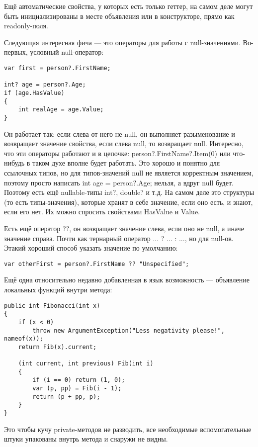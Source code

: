 \documentclass{../../text-style}
\begin{document}
Ещё автоматические свойства, у которых есть только геттер, на самом деле могут быть инициализированы в месте объявления или в конструкторе, прямо как readonly-поля.

Следующая интересная фича --- это операторы для работы с null-значениями. Во-первых, условный null-оператор:

\begin{verbatim}
var first = person?.FirstName;

int? age = person?.Age;
if (age.HasValue)
{
    int realAge = age.Value;
}
\end{verbatim}

Он работает так: если слева от него не null, он выполняет разыменование и возвращает значение свойства, если слева null, то возвращает null. Интересно, что эти операторы работают и в цепочке: person?.FirstName?.Item(0) или что-нибудь в таком духе вполне будет работать. Это хорошо и понятно для ссылочных типов, но для типов-значений null не является корректным значением, поэтому просто написать int age = person?.Age; нельзя, а вдруг null будет. Поэтому есть ещё nullable-типы int?, double? и т.д. На самом деле это структуры (то есть типы-значения), которые хранят в себе значение, если оно есть, и знают, если его нет. Их можно спросить свойствами HasValue и Value.

Есть ещё оператор ??, он возвращает значение слева, если оно не null, а иначе значение справа. Почти как тернарный оператор ... ? ... : ..., но для null-ов. Этакий хороший способ указать значение по умолчанию:

\begin{verbatim}
var otherFirst = person?.FirstName ?? "Unspecified";
\end{verbatim}

Ещё одна относительно недавно добавленная в язык возможность --- объявление локальных функций внутри метода:

\begin{verbatim}
public int Fibonacci(int x)
{
    if (x < 0) 
        throw new ArgumentException("Less negativity please!", nameof(x));
    return Fib(x).current;

    (int current, int previous) Fib(int i)
    {
        if (i == 0) return (1, 0);
        var (p, pp) = Fib(i - 1);
        return (p + pp, p);
    }
}
\end{verbatim}

Это чтобы кучу private-методов не разводить, все необходимые вспомогательные штуки упакованы внутрь метода и снаружи не видны.
\end{document}
